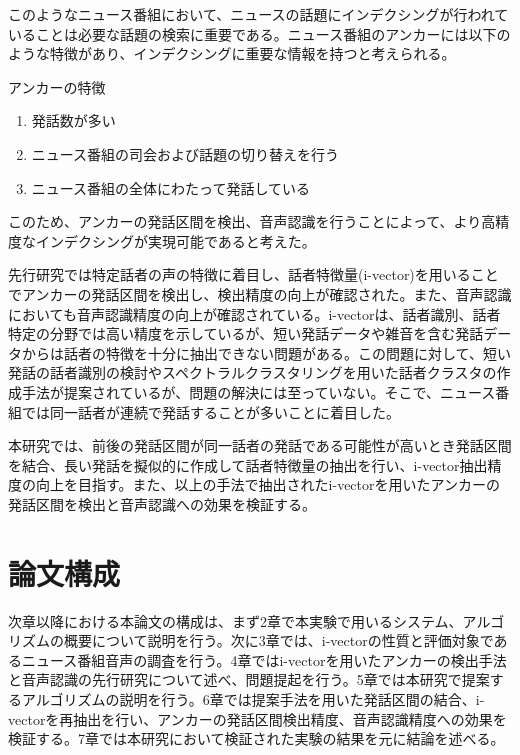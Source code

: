 このようなニュース番組において、ニュースの話題にインデクシングが行われていることは必要な話題の検索に重要である。ニュース番組のアンカーには以下のような特徴があり、インデクシングに重要な情報を持つと考えられる。\newline

アンカーの特徴
\begin{enumerate}
\item 発話数が多い
\item ニュース番組の司会および話題の切り替えを行う
\item ニュース番組の全体にわたって発話している
\end{enumerate}\par

このため、アンカーの発話区間を検出、音声認識を行うことによって、より高精度なインデクシングが実現可能であると考えた。\par
先行研究では特定話者の声の特徴に着目し、話者特徴量(i-vector)を用いることでアンカーの発話区間を検出し、検出精度の向上が確認された。また、音声認識においても音声認識精度の向上が確認されている。i-vectorは、話者識別、話者特定の分野では高い精度を示しているが、短い発話データや雑音を含む発話データからは話者の特徴を十分に抽出できない問題がある。この問題に対して、短い発話の話者識別の検討\cite{panaiv}やスペクトラルクラスタリングを用いた話者クラスタの作成手法\cite{spectroclus}が提案されているが、問題の解決には至っていない。そこで、ニュース番組では同一話者が連続で発話することが多いことに着目した。\par
本研究では、前後の発話区間が同一話者の発話である可能性が高いとき発話区間を結合、長い発話を擬似的に作成して話者特徴量の抽出を行い、i-vector抽出精度の向上を目指す。また、以上の手法で抽出されたi-vectorを用いたアンカーの発話区間を検出と音声認識への効果を検証する。

\section{論文構成}
次章以降における本論文の構成は、まず2章で本実験で用いるシステム、アルゴリズムの概要について説明を行う。次に3章では、i-vectorの性質と評価対象であるニュース番組音声の調査を行う。4章ではi-vectorを用いたアンカーの検出手法と音声認識の先行研究について述べ、問題提起を行う。5章では本研究で提案するアルゴリズムの説明を行う。6章では提案手法を用いた発話区間の結合、i-vectorを再抽出を行い、アンカーの発話区間検出精度、音声認識精度への効果を検証する。7章では本研究において検証された実験の結果を元に結論を述べる。

